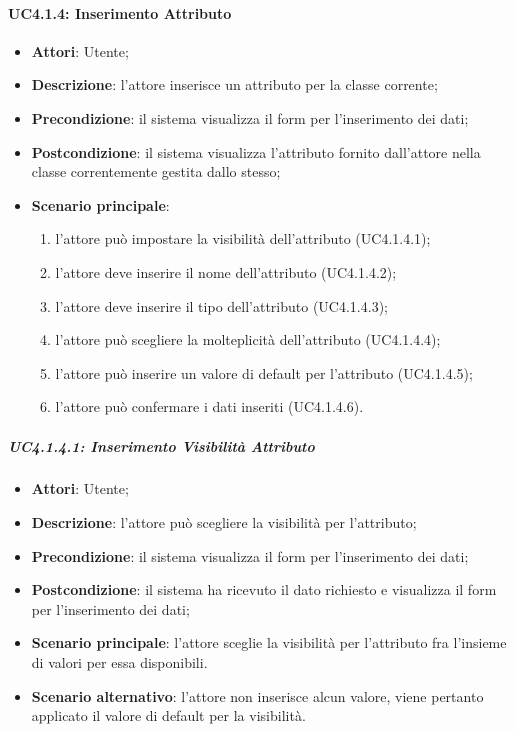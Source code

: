 \paragraph{UC4.1.4: Inserimento Attributo}
\label{UC4.1.4}
\begin{itemize}
	\item \textbf{Attori}: Utente;
	\item \textbf{Descrizione}: l'attore inserisce un attributo per la classe corrente;
	\item \textbf{Precondizione}: il sistema visualizza il form per l'inserimento dei dati;
	\item \textbf{Postcondizione}: il sistema visualizza l'attributo fornito dall'attore nella classe correntemente gestita dallo stesso;
	\item \textbf{Scenario principale}:
	\begin{enumerate}
		\item l'attore può impostare la visibilità dell'attributo (UC4.1.4.1);
		\item l'attore deve inserire il nome dell'attributo (UC4.1.4.2);
		\item l'attore deve inserire il tipo dell'attributo (UC4.1.4.3);
		\item l'attore può scegliere la molteplicità dell'attributo (UC4.1.4.4);
		\item l'attore può inserire un valore di default per l'attributo (UC4.1.4.5);
		\item l'attore può confermare i dati inseriti (UC4.1.4.6).
	\end{enumerate}
\end{itemize}

\subparagraph{UC4.1.4.1: Inserimento Visibilità Attributo}
\label{UC4.1.4.1}
\begin{itemize}
	\item \textbf{Attori}: Utente;
	\item \textbf{Descrizione}: l'attore può scegliere la visibilità per l'attributo;
	\item \textbf{Precondizione}: il sistema visualizza il form per l'inserimento dei dati;
	\item \textbf{Postcondizione}: il sistema ha ricevuto il dato richiesto e visualizza il form per l'inserimento dei dati;
	\item \textbf{Scenario principale}: l'attore sceglie la visibilità per l'attributo fra l'insieme di valori per essa disponibili.
	\item \textbf{Scenario alternativo}: l'attore non inserisce alcun valore, viene pertanto applicato il valore di default per la visibilità.
\end{itemize}

